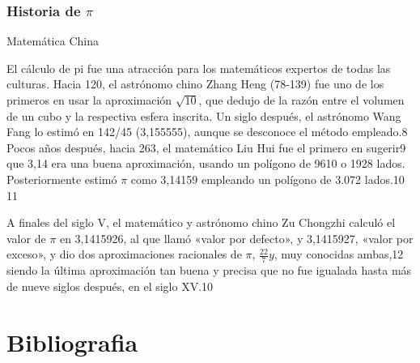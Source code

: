 \documentclass{beamer}
\begin{document}
\begin{frame}
  \frametitle{Historia de $\pi$}
  \begin {block}{Matemática China}
  
El cálculo de pi fue una atracción para los matemáticos expertos de todas las culturas. Hacia 120, el astrónomo chino Zhang Heng (78-139) fue uno de los primeros en usar la aproximación $\sqrt {10}$, que dedujo de la razón entre el volumen de un cubo y la respectiva esfera inscrita. Un siglo después, el astrónomo Wang Fang lo estimó en 142/45 (3,155555), aunque se desconoce el método empleado.8 Pocos años después, hacia 263, el matemático Liu Hui fue el primero en sugerir9 que 3,14 era una buena aproximación, usando un polígono de 9610 o 1928 lados. Posteriormente estimó $\pi$ como 3,14159 empleando un polígono de 3.072 lados.10 11

A finales del siglo V, el matemático y astrónomo chino Zu Chongzhi calculó el valor de $\pi$ en 3,1415926, al que llamó «valor por defecto», y 3,1415927, «valor por exceso», y dio dos aproximaciones racionales de $\pi$, $\frac{22}{7} y $, muy conocidas ambas,12 siendo la última aproximación tan buena y precisa que no fue igualada hasta más de nueve siglos después, en el siglo XV.10
\end {block}
\end {frame}

\section {Bibliografia}

\begin{frame}

\end{frame}
\end{document}
